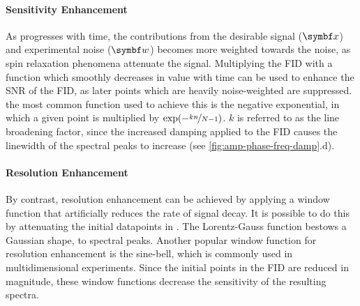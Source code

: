 \paragraph{Sensitivity Enhancement} As  progresses with time, the
contributions from the desirable signal ($\bx$) and experimental noise ($\bw$)
becomes more weighted towards the noise, as spin relaxation phenomena attenuate
the signal.  Multiplying the \ac{FID} with a function which smoothly decreases
in value with time can be used to enhance the \ac{SNR} of the \ac{FID}, as
later points which are heavily noise-weighted are suppressed.
\label{corr:exp-apod} the most common function used to
achieve this is the negative exponential, in which a given point is multiplied
by $\exp(-\nicefrac{k n}{N - 1})$.  $k$ is referred to as the line broadening
factor, since the increased damping applied to the \ac{FID} causes the
linewidth of the spectral peaks to increase (see
\cref{fig:amp-phase-freq-damp}.d).

\paragraph{Resolution Enhancement} By contrast, resolution enhancement can be
achieved by applying a window function that artificially reduces the rate of
signal decay. It is possible to do this by attenuating the initial datapoints in
. The Lorentz-Gauss function bestows a Gaussian shape,
\label{corr:gaussian} to spectral peaks. Another popular window
function for resolution enhancement is the sine-bell, which is commonly used in
multidimensional experiments. Since the initial points in the \ac{FID} are
reduced in magnitude, these window functions decrease the sensitivity of the
resulting spectra.

\label{corr:trunc}

